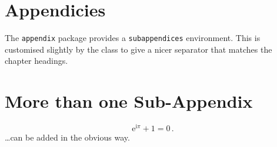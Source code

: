 \section{Appendicies}

The \texttt{appendix} package provides a \texttt{subappendices}
 environment. This is customised slightly by the class to give a nicer
separator that matches the chapter headings.

\section{More than one Sub-Appendix}
\begin{equation}
\mathrm{e}^{\mathrm{i}\pi} + 1 = 0 \, .
\end{equation}
\ldots can be added in the obvious way.

